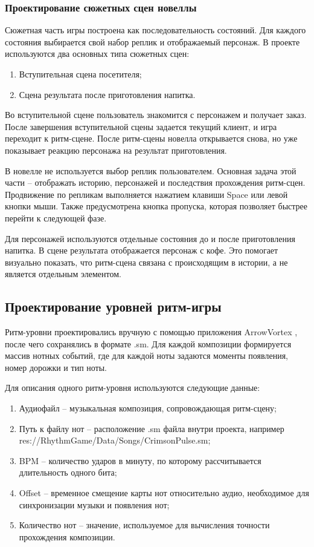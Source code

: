 \documentclass[utf8, russian]{eskdtext}
\numberwithin{equation}{section}
\begin{document}
\subsubsection{Проектирование сюжетных сцен новеллы}

Сюжетная часть игры построена как последовательность состояний. Для каждого состояния выбирается свой набор реплик и отображаемый персонаж. В проекте используются два основных типа сюжетных сцен:

\begin{enumerate}
    \item Вступительная сцена посетителя;
    \item Сцена результата после приготовления напитка.
\end{enumerate}

Во вступительной сцене пользователь знакомится с персонажем и получает заказ. После завершения вступительной сцены задается текущий клиент, и игра переходит к ритм-сцене. После ритм-сцены новелла открывается снова, но уже показывает реакцию персонажа на результат приготовления.

В новелле не используется выбор реплик пользователем. Основная задача этой части -- отображать историю, персонажей и последствия прохождения ритм-сцен. Продвижение по репликам выполняется нажатием клавиши Space или левой кнопки мыши. Также предусмотрена кнопка пропуска, которая позволяет быстрее перейти к следующей фазе.

Для персонажей используются отдельные состояния до и после приготовления напитка. В сцене результата отображается персонаж с кофе. Это помогает визуально показать, что ритм-сцена связана с происходящим в истории, а не является отдельным элементом.

\subsection{Проектирование уровней ритм-игры}

Ритм-уровни проектировались вручную с помощью приложения ArrowVortex \cite{arrowvortex}, после чего сохранялись в формате .sm. Для каждой композиции формируется массив нотных событий, где для каждой ноты задаются моменты появления, номер дорожки и тип ноты.

Для описания одного ритм-уровня используются следующие данные:

\begin{enumerate}
    \item Аудиофайл -- музыкальная композиция, сопровождающая ритм-сцену;
    \item Путь к файлу нот -- расположение .sm файла внутри проекта, например res://RhythmGame/Data/Songs/CrimsonPulse.sm;
    \item BPM -- количество ударов в минуту, по которому рассчитывается длительность одного бита;
    \item Offset -- временное смещение карты нот относительно аудио, необходимое для синхронизации музыки и появления нот;
    \item Количество нот -- значение, используемое для вычисления точности прохождения композиции.
\end{enumerate}
\end{document}
